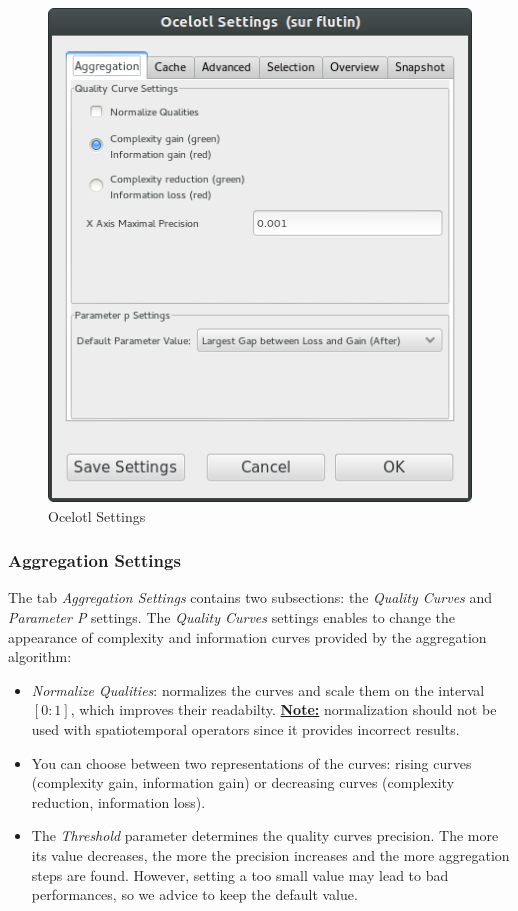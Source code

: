 \documentclass[twoside]{article}
\begin{document}
\begin{sloppypar}
\begin{figure}[h!]
	\centering
	\includegraphics[scale=0.5]{images/ocelotlSettings.png}
	\caption{Ocelotl Settings}
	\label{ocelotlsettings}
\end{figure}

\subsubsection{Aggregation Settings}
The tab \textit{Aggregation Settings} contains two subsections: the \textit{Quality Curves} and \textit{Parameter P} settings. The \textit{Quality Curves} settings enables to change the appearance of complexity and information curves provided by the aggregation algorithm:
\begin{itemize}
	\item \textit{Normalize Qualities}: normalizes the curves and scale them on the interval $[0:1]$, which improves their readabilty. \underline{\textbf{Note:}} normalization should not be used with spatiotemporal operators since it provides incorrect results.
    \item You can choose between two representations of the curves: rising curves (complexity gain, information gain) or decreasing curves (complexity reduction, information loss).
    \item The \textit{Threshold} parameter determines the quality curves precision. The more its value decreases, the more the precision increases and the more aggregation steps are found. However, setting a too small value may lead to bad performances, so we advice to keep the default value.
\end{itemize}


\end{sloppypar}
\end{document}
